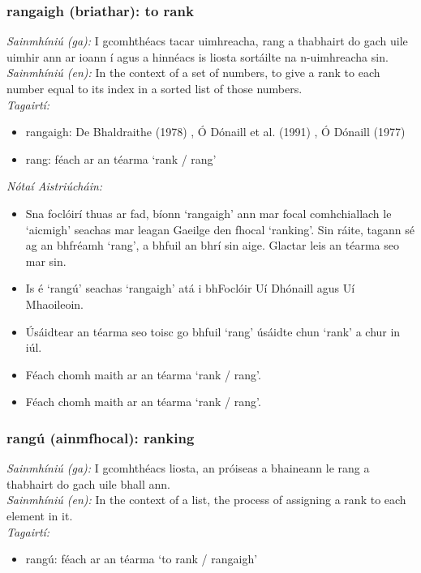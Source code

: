 \subsubsection*{rangaigh (briathar): to rank}
 \noindent \textit{Sainmhíniú (ga):} I gcomhthéacs tacar uimhreacha, rang a thabhairt do gach uile uimhir ann ar ioann í agus a hinnéacs is liosta sortáilte na n-uimhreacha sin.
\\
 \noindent \textit{Sainmhíniú (en):} In the context of a set of numbers, to give a rank to each number equal to its index in a sorted list of those numbers.
\\
 \noindent \textit{Tagairtí:}
\begin{itemize}
	\item rangaigh: De Bhaldraithe (1978) \cite{de-bhaldraithe}, Ó Dónaill et al. (1991) \cite{focloir-beag}, Ó Dónaill (1977) \cite{odonaill}
	\item rang: féach ar an téarma `rank / rang'
\end{itemize}

 \noindent \textit{Nótaí Aistriúcháin:}
\begin{itemize}
	\item Sna foclóirí thuas ar fad, bíonn `rangaigh' ann mar focal comhchiallach le `aicmigh' seachas mar leagan Gaeilge den fhocal `ranking'. Sin ráite, tagann sé ag an bhfréamh `rang', a bhfuil an bhrí sin aige. Glactar leis an téarma seo mar sin.
	\item Is é `rangú' seachas `rangaigh' atá i bhFoclóir Uí Dhónaill agus Uí Mhaoileoin.
	\item Úsáidtear an téarma seo toisc go bhfuil `rang' úsáidte chun `rank' a chur in iúl.
	\item Féach chomh maith ar an téarma `rank / rang'.
	\item Féach chomh maith ar an téarma `rank / rang'.
\end{itemize}


\subsubsection*{rangú (ainmfhocal): ranking}
 \noindent \textit{Sainmhíniú (ga):} I gcomhthéacs liosta, an próiseas a bhaineann le rang a thabhairt do gach uile bhall ann.
\\
 \noindent \textit{Sainmhíniú (en):} In the context of a list, the process of assigning a rank to each element in it.
\\
 \noindent \textit{Tagairtí:}
\begin{itemize}
	\item rangú: féach ar an téarma `to rank / rangaigh'
\end{itemize}

